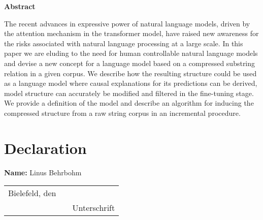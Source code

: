 
\begin{center}
\bf{Abstract}\label{sec:abstract}
\end{center}


The recent advances in expressive power of natural language models, driven by the attention mechanism in the transformer model, have raised new awareness for the risks associated with natural language processing at a large scale. In this paper we are eluding to the need for human controllable natural language models and devise a new concept for a language model based on a compressed substring relation in a given corpus. We describe how the resulting structure could be used as a language model where causal explanations for its predictions can be derived, model structure can accurately be modified and filtered in the fine-tuning stage. We provide a definition of the model and describe an algorithm for inducing the compressed structure from a raw string corpus in an incremental procedure.

\vspace*{\fill}


\section*{Declaration}\label{sec:declaration}
{\bf Name:} Linus Behrbohm 

\vspace{2cm}



\vspace{2cm} 


\begin{tabular}{lp{2em}l} 
Bielefeld, den \date \today    && \hspace{4cm} \\\cline{1-1}\cline{3-3} 
   && Unterschrift 
\end{tabular}
\newpage